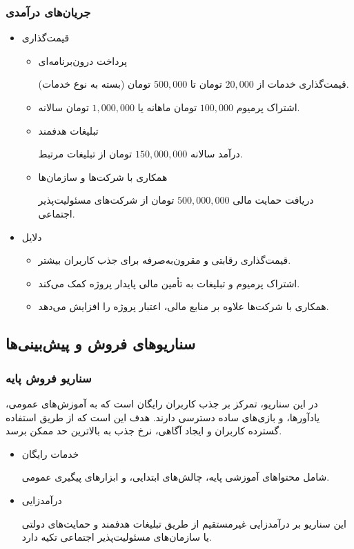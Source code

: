 \documentclass[dvipsnames, svgnames, x11names, 11pt]{article}
\begin{document}
\subsubsection{جریان‌های درآمدی}
\begin{itemize}
\item 
قیمت‌گذاری
\begin{itemize}
\item 
پرداخت درون‌برنامه‌ای

قیمت‌گذاری خدمات از
$20,000$
تومان تا
$500,000$
تومان (بسته به نوع خدمات).

\item 
اشتراک پرمیوم
$100,000$
تومان ماهانه یا
$1,000,000$
تومان سالانه.

\item 
تبلیغات هدفمند

درآمد سالانه
$150,000,000$
تومان از تبلیغات مرتبط.

\item 
همکاری با شرکت‌ها و سازمان‌ها 

دریافت حمایت مالی
$500,000,000$
تومان از شرکت‌های مسئولیت‌پذیر اجتماعی.
\end{itemize}

\item 
دلایل
\begin{itemize}
\item 
قیمت‌گذاری رقابتی و مقرون‌به‌صرفه برای جذب کاربران بیشتر.
\item 
اشتراک پرمیوم و تبلیغات به تأمین مالی پایدار پروژه کمک می‌کند.
\item 
همکاری با شرکت‌ها علاوه بر منابع مالی، اعتبار پروژه را افزایش می‌دهد.
\end{itemize}
\end{itemize}

\subsection{سناریوهای فروش و پیش‌بینی‌ها }
\subsubsection{سناریو فروش پایه }
در این سناریو، تمرکز بر جذب کاربران رایگان است که به آموزش‌های عمومی، یادآورها، و بازی‌های ساده دسترسی دارند. هدف این است که از طریق استفاده گسترده کاربران و ایجاد آگاهی، نرخ جذب  به بالاترین حد ممکن برسد.

\begin{itemize}
\item 
خدمات رایگان

شامل محتواهای آموزشی پایه، چالش‌های ابتدایی، و ابزارهای پیگیری عمومی.
\item 
درآمدزایی

این سناریو بر درآمدزایی غیرمستقیم از طریق تبلیغات هدفمند و حمایت‌های دولتی یا سازمان‌های مسئولیت‌پذیر اجتماعی  تکیه دارد.
\end{itemize}
\end{document}
